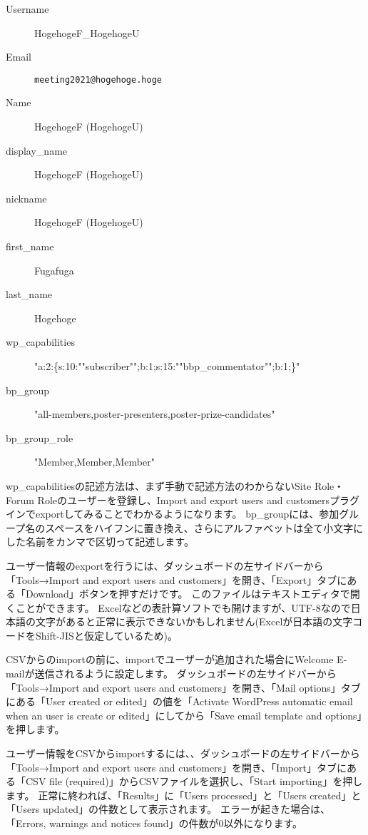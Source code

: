 \documentclass[titlepage,10pt,a4paper,uplatex]{jsbook}
\begin{document}
\begin{description}
\item[Username] HogehogeF\_HogehogeU
\item[Email] \texttt{meeting2021@hogehoge.hoge}
\item[Name] HogehogeF (HogehogeU)
\item[display\_name] HogehogeF (HogehogeU)
\item[nickname] HogehogeF (HogehogeU)
\item[first\_name] Fugafuga
\item[last\_name] Hogehoge
\item[wp\_capabilities] "a:2:\{s:10:""subscriber"";b:1;s:15:""bbp\_commentator"";b:1;\}"
\item[bp\_group] "all-members,poster-presenters,poster-prize-candidates"
\item[bp\_group\_role] "Member,Member,Member"
\end{description}

wp\_capabilitiesの記述方法は、まず手動で記述方法のわからないSite Role・Forum Roleのユーザーを登録し、Import and export users and customersプラグインでexportしてみることでわかるようになります。
bp\_groupには、参加グループ名のスペースをハイフンに置き換え、さらにアルファベットは全て小文字にした名前をカンマで区切って記述します。

ユーザー情報のexportを行うには、ダッシュボードの左サイドバーから「Tools→Import and export users and customers」を開き、「Export」タブにある「Download」ボタンを押すだけです。
このファイルはテキストエディタで開くことができます。
Excelなどの表計算ソフトでも開けますが、UTF-8なので日本語の文字があると正常に表示できないかもしれません(Excelが日本語の文字コードをShift-JISと仮定しているため)。

CSVからのimportの前に、importでユーザーが追加された場合にWelcome E-mailが送信されるように設定します。
ダッシュボードの左サイドバーから「Tools→Import and export users and customers」を開き、「Mail options」タブにある「User created or edited」の値を「Activate WordPress automatic email when an user is create or edited」にしてから「Save email template and options」を押します。

ユーザー情報をCSVからimportするには、、ダッシュボードの左サイドバーから「Tools→Import and export users and customers」を開き、「Import」タブにある「CSV file (required)」からCSVファイルを選択し、「Start importing」を押します。
正常に終われば、「Results」に「Users processed」と「Users created」と「Users updated」の件数として表示されます。
エラーが起きた場合は、「Errors, warnings and notices found」の件数が0以外になります。
\end{document}
